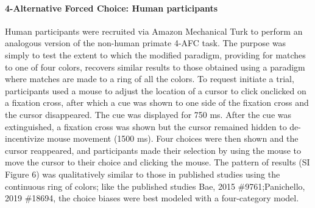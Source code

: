 \paragraph{4-Alternative Forced Choice: Human participants}
Human participants were recruited via Amazon Mechanical Turk to perform an analogous version of the non-human primate 4-AFC task. The purpose was simply to test the extent to which the modified paradigm, providing for matches to one of four colors, recovers similar results to those obtained using a paradigm where matches are made to a ring of all the colors.  To request initiate a trial, participants used a mouse to adjust the location of a cursor to click onclicked on a fixation cross, after which a cue was shown to one side of the fixation cross and the cursor disappeared. The cue was displayed for 750 ms. After the cue was extinguished, a fixation cross was shown but the cursor remained hidden to de-incentivize mouse movement (1500 ms). Four choices were then shown and the cursor reappeared, and participants made their selection by using the mouse to move the cursor to their choice and clicking the mouse. The pattern of results (SI Figure 6) was qualitatively similar to those in published studies using the continuous ring of colors; like the published studies {Bae, 2015 \#9761;Panichello, 2019 \#18694}, the choice biases were best modeled with a four-category model. 
